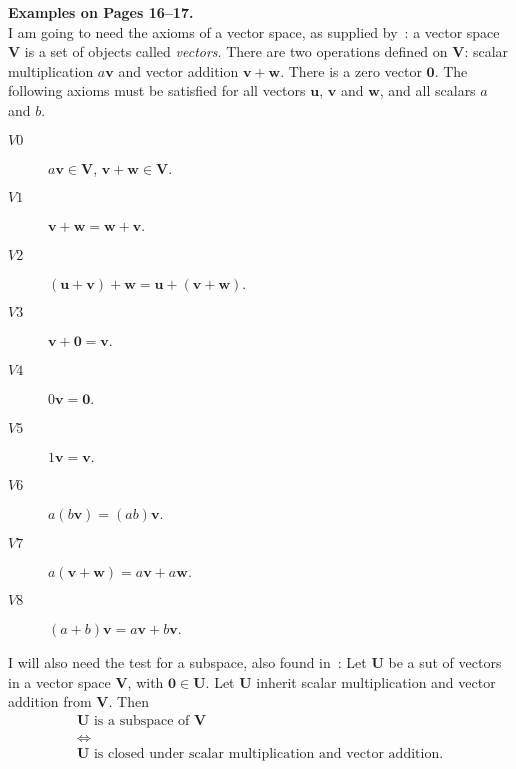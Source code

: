 \documentclass[a4paper,11pt]{article}
\numberwithin{equation}{section}
\def\vecu{\boldsymbol{u}}
\def\vecv{\boldsymbol{v}}
\def\vecw{\boldsymbol{w}}
\def\vecU{\boldsymbol{U}}
\def\vecV{\boldsymbol{V}}
\def\veczero{\boldsymbol{0}}
\begin{document}
{\bf Examples on Pages 16--17.}\\
I am going to need the axioms of a vector space, as supplied 
by~\cite{Macdonald}: a vector space $\vecV$ is a set of objects called 
{\sl vectors}.
There are two operations defined on $\vecV$: scalar multiplication $a \vecv$ and
vector addition $\vecv + \vecw$.
There is a zero vector $\veczero$.
The following axioms must be satisfied for all vectors $\vecu$, $\vecv$ and
$\vecw$, and all scalars $a$ and $b$.
\begin{description}
    \item[$V0$] $a \vecv \in \vecV$, $\vecv + \vecw \in \vecV$.
    \item[$V1$] $\vecv + \vecw = \vecw + \vecv$.
    \item[$V2$] $(\vecu + \vecv) + \vecw = \vecu + (\vecv + \vecw)$.
    \item[$V3$] $\vecv + \veczero = \vecv$.
    \item[$V4$] $0 \vecv = \veczero$.
    \item[$V5$] $1 \vecv = \vecv$.
    \item[$V6$] $a (b \vecv) = (a b) \vecv$.
    \item[$V7$] $a (\vecv + \vecw) = a \vecv + a \vecw$.
    \item[$V8$] $(a + b) \vecv = a \vecv + b \vecv$.
\end{description}
I will also need the test for a subspace, also found in~\cite{Macdonald}:
Let $\vecU$ be a sut of vectors in a vector space $\vecV$,
with $\veczero \in \vecU$. 
Let $\vecU$ inherit scalar multiplication and vector addition from $\vecV$.
Then
\begin{gather}
    \vecU \text{ is a subspace of } \vecV  \\
    \iff \\
    \vecU \text{ is closed under scalar multiplication and vector addition.}
\end{gather}


\end{document}
